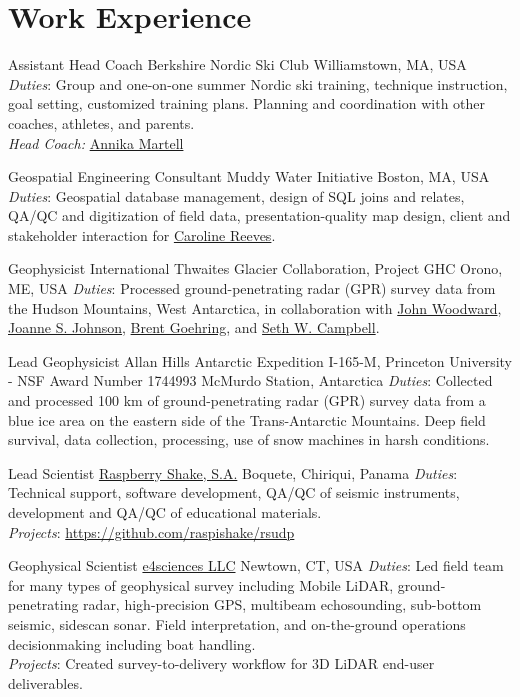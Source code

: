 \documentclass[a4paper,12pt,sans,colorlinks]{moderncv}
\newcommand{\seth}{\href{https://www.alpinesciences.net}{Seth W. Campbell}}
\newcommand{\johnwoodward}{\href{https://www.northumbria.ac.uk/about-us/our-staff/w/john-woodward}{John Woodward}}
\newcommand{\joannejohnson}{\href{https://www.bas.ac.uk/profile/jsj/}{Joanne S. Johnson}}
\newcommand{\brent}{\href{https://sse.tulane.edu/eens/faculty/goehring}{Brent Goehring}}
\newcommand{\caroline}{\href{https://www.muddywaterinitiative.org/leadership}{Caroline Reeves}}
\newcommand{\annika}{\href{https://ephsports.williams.edu/sports/mens-skiing/roster/coaches/annika-martell/525}{Annika Martell}}
\newcommand{\raspishake}{\href{https://raspberryshake.org}{Raspberry Shake, S.A.}}
\newcommand{\efour}{\href{https://e4sciences.com}{e4sciences LLC}}
\begin{document}
\section{Work Experience}

{Assistant Head Coach}
{Berkshire Nordic Ski Club}
{Williamstown, MA, USA}
{}
{
    \emph{Duties}: Group and one-on-one summer Nordic ski training, technique instruction, goal setting, customized training
    plans. Planning and coordination with other coaches, athletes, and parents.\\
    \emph{Head Coach:} \annika
}

{Geospatial Engineering Consultant}
{Muddy Water Initiative}
{Boston, MA, USA}
{}
{
    \emph{Duties}: Geospatial database management, design of SQL joins and
    relates, QA/QC and digitization of field data, presentation-quality map
    design, client and stakeholder interaction for \caroline.
}

{Geophysicist}
{International Thwaites Glacier Collaboration, Project GHC}
{Orono, ME, USA}
{}
{
    \emph{Duties}: Processed ground-penetrating radar (GPR) survey data
    from the Hudson Mountains, West Antarctica, in collaboration with
    \johnwoodward, \joannejohnson, \brent, and \seth.
}

{Lead Geophysicist}
{Allan Hills Antarctic Expedition I-165-M,
Princeton University - NSF Award Number 1744993}
{McMurdo Station, Antarctica}
{}
{
    \emph{Duties}: Collected and processed 100 km of ground-penetrating
    radar (GPR) survey data from a blue ice area on the eastern side of the
    Trans-Antarctic Mountains. Deep field survival, data collection,
    processing, use of snow machines in harsh conditions.
}

{Lead Scientist}
{\raspishake{}}
{Boquete, Chiriqui, Panama}
{}
{
    \emph{Duties}: Technical support, software development,
    QA/QC of seismic instruments, development and QA/QC of
    educational materials.
    \\
    \emph{Projects}: \url{https://github.com/raspishake/rsudp}
}

{Geophysical Scientist}
{\efour{}}
{Newtown, CT, USA}
{}
{
    \emph{Duties}: Led field team for many types of geophysical survey
    including Mobile LiDAR, ground-penetrating radar, high-precision GPS,
    multibeam echosounding, sub-bottom seismic, sidescan sonar. Field
    interpretation, and on-the-ground operations decisionmaking including
    boat handling.
    \\
    \emph{Projects}: Created survey-to-delivery workflow for 3D LiDAR
    end-user deliverables.
}
\end{document}
